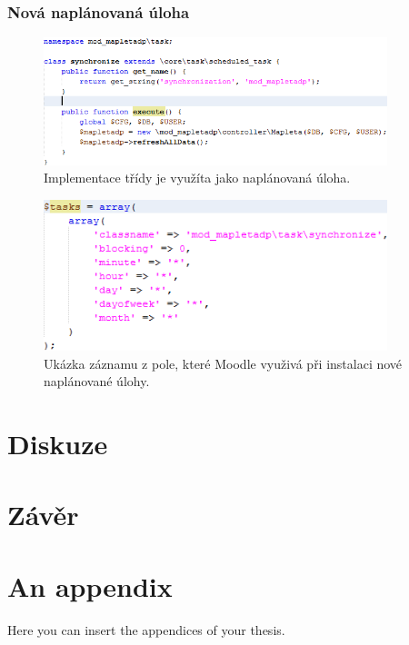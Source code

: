 \documentclass[
print,
  11pt,
  table,   
  nolof,    
  nolot,
  oneside,
  draft
]{fithesis3}
\begin{document}
		\subsection{Nová naplánovaná úloha}

		\begin{figure}
		  \begin{center}
		    \includegraphics[width=100mm]{images/cron-trida.png}
		   \end{center}
		  \caption{Implementace třídy je využíta jako naplánovaná úloha. }
		  \label{fig:crontrida}
		\end{figure}

		\begin{figure}
		  \begin{center}
		    \includegraphics[width=100mm]{images/cron-registrace.png}
		   \end{center}
		  \caption{Ukázka záznamu z pole, které Moodle využivá při instalaci nové naplánované úlohy.}
		  \label{fig:cronregistrace}
		\end{figure}
\chapter{Diskuze}

\chapter{Závěr}




\printbibliography[heading=bibintoc]
\listoffigures
\listoftables




\makeatletter\thesis@blocks@clear\makeatother
{} %

\makeatletter\thesis@blocks@clear\makeatother

\renewcommand{\theHchapter}{A\arabic{chapter}}
\appendix %

\chapter{An appendix}
Here you can insert the appendices of your thesis.
\end{document}
